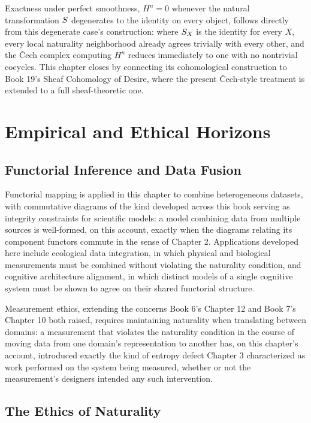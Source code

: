 Exactness under perfect smoothness, $H^n = 0$ whenever the natural transformation $S$ degenerates to the identity on every object, follows directly from this degenerate case's construction: where $S_X$ is the identity for every $X$, every local naturality neighborhood already agrees trivially with every other, and the Čech complex computing $H^n$ reduces immediately to one with no nontrivial cocycles. This chapter closes by connecting its cohomological construction to Book 19's Sheaf Cohomology of Desire, where the present Čech-style treatment is extended to a full sheaf-theoretic one.

\part{Empirical and Ethical Horizons}

\chapter{Functorial Inference and Data Fusion}

Functorial mapping is applied in this chapter to combine heterogeneous datasets, with commutative diagrams of the kind developed across this book serving as integrity constraints for scientific models: a model combining data from multiple sources is well-formed, on this account, exactly when the diagrams relating its component functors commute in the sense of Chapter 2. Applications developed here include ecological data integration, in which physical and biological measurements must be combined without violating the naturality condition, and cognitive architecture alignment, in which distinct models of a single cognitive system must be shown to agree on their shared functorial structure.

Measurement ethics, extending the concerns Book 6's Chapter 12 and Book 7's Chapter 10 both raised, requires maintaining naturality when translating between domains: a measurement that violates the naturality condition in the course of moving data from one domain's representation to another has, on this chapter's account, introduced exactly the kind of entropy defect Chapter 3 characterized as work performed on the system being measured, whether or not the measurement's designers intended any such intervention.

\chapter{The Ethics of Naturality}

